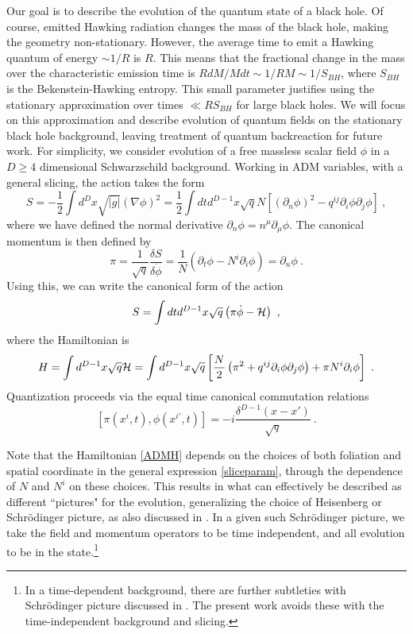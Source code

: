 \documentclass[12pt]{article}
\numberwithin{equation}{section}
\newcommand{\calh}{{\cal H}}
\newcommand{\beq}{\begin{equation}}
\newcommand{\eeq}{\end{equation}}
\newcommand{\hf}{\frac{1}{2}}
\begin{document}
Our goal is to describe the evolution of the quantum state of a black hole.  
Of course, emitted Hawking radiation changes the mass of the black hole, making the geometry non-stationary.  However, the average time to emit a Hawking quantum of energy $\sim 1/R$ is $R$.  This means that the fractional change in the mass over the characteristic emission time is $R dM/Mdt\sim 1/RM \sim 1/S_{BH}$, where $S_{BH}$ is the Bekenstein-Hawking entropy.  This small parameter justifies using the stationary approximation over times $\ll R S_{BH}$ for large black holes.  We will focus on this approximation and describe evolution of quantum fields on the stationary black hole background, leaving treatment of quantum backreaction for future work.
For simplicity, we consider  evolution of a free massless scalar field $\phi$ in a $D\geq 4$ dimensional Schwarzschild background. Working in ADM variables, with a general slicing, the action takes the form 
\beq\label{Sact}
S=-\hf \int d^D x \sqrt{|g|} (\nabla\phi)^2 =  \frac{1}{2} \int dt d^{D-1}x \sqrt q N \left[ (\partial_n\phi)^2 - q^{ij}\partial_i \phi \partial_j \phi\right]\ ,
\eeq
where we have defined the normal derivative $\partial_n\phi=n^\mu\partial_\mu \phi$.  
The canonical momentum is then defined by
\beq\label{canonmom}
\pi= \frac{1}{\sqrt q}\frac{\delta S}{ \delta \dot\phi} = \frac{1}{N}\left(\partial_t \phi - N^i\partial_i\phi\right) = \partial_n\phi\ .
\eeq
Using this, we can write the canonical form of the action
\beq
S=\int dt d^{D-1}x \sqrt q \left(\pi \dot\phi  - \calh\right)\ ,
\eeq
where the Hamiltonian is
\beq\label{ADMH}
H =  \int d^{D-1} x \sqrt q \calh= \int d^{D-1} x \sqrt q \left[ \frac{N}{2}\left(\pi^2+q^{ij}\partial_i\phi \partial_j\phi\right) + \pi N^i \partial_i\phi \right] \ .
\eeq 
Quantization proceeds via the equal time canonical commutation relations
\beq\label{CCRs}
[\pi(x^i, t), \phi(x^{i\prime}, t)]=-i \frac{\delta^{D-1}(x-x')}{\sqrt{q}}\ .
\eeq

Note that the Hamiltonian \eqref{ADMH} depends on the choices of both foliation and spatial coordinate in the general expression
\eqref{sliceparam}, through the dependence of $N$ and $N^i$ on these choices.  This results in what can effectively be described as different ``pictures" for the evolution, generalizing the choice of Heisenberg or Schr\"odinger picture, as also discussed in \cite{SE2d}.  In a given such Schr\"odinger picture, we take the field and momentum operators to be time independent, and all evolution to be in the state.\footnote{In a time-dependent background, there are further subtleties with Schr\"odinger picture discussed in \cite{ToVa,CMOV,CFMM,AgAs,MuOe}. The present work avoids these with the time-independent background and slicing.}  
\end{document}
